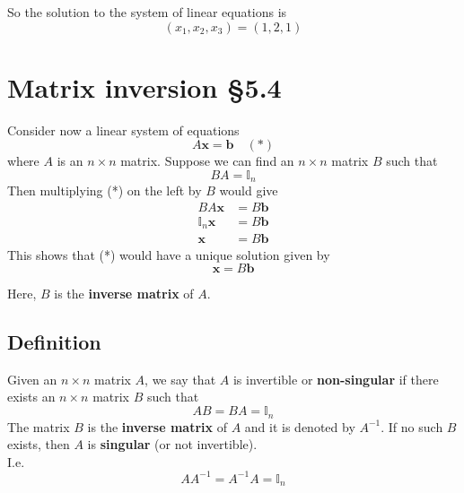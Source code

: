 \documentclass[11pt]{article}
\renewcommand{\vec}[1]{\mathbf{#1}}
\begin{document}
So the solution to the system of linear equations is
\[ (x_1, x_2, x_3) = (1, 2, 1) \]

\section{Matrix inversion §5.4}
Consider now a linear system of equations
\[ A \vec{x} = \vec{b} \quad (*) \]
where $A$ is an $n \times n$ matrix. Suppose we can find an $n \times n$ matrix $B$ such that
\[ BA = \mathbb{I}_n \]
Then multiplying (*) on the left by $B$ would give
\begin{align*}
BA \vec{x} &= B\vec{b} \\
\mathbb{I}_n \vec{x} &= B\vec{b} \\
\vec{x} &= B\vec{b}
\end{align*}
This shows that (*) would have a unique solution given by 
\[ \vec{x} = B\vec{b} \]

Here, $B$ is the \textbf{inverse matrix} of $A$.

\subsection{Definition}
Given an $n \times n$ matrix $A$, we say that $A$ is invertible or \textbf{non-singular} if there exists an $n \times n$ matrix $B$ such that
\[ AB = BA = \mathbb{I}_n \]
The matrix $B$ is the \textbf{inverse matrix} of $A$ and it is denoted by $A^{-1}$. If no such $B$ exists, then $A$ is \textbf{singular} (or not invertible).\\
I.e.
\[ A A^{-1} = A^{-1}A = \mathbb{I}_n \]
\end{document}

